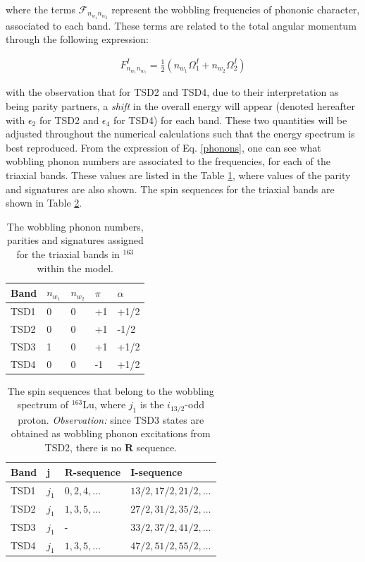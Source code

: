 \documentclass[%
 reprint,
 amsmath,
 amssymb,
 aps,
 floatfix,
]{revtex4-2}
\begin{document}
where the terms $\mathcal{F}_{n_{w_1}n_{w_2}}$ represent the wobbling frequencies of phononic character, associated to each band. These terms are related to the total angular momentum through the following expression:

\begin{align}
    F_{n_{w_1}n_{w_1}}^I=\frac{1}{2}\left(n_{w_1}\Omega_1^I+n_{w_2}\Omega_2^I\right) \label{phonons}
\end{align}

with the observation that for TSD2 and TSD4, due to their interpretation as being parity partners, a \emph{shift} in the overall energy will appear (denoted hereafter with $\epsilon_2$ for TSD2 and $\epsilon_4$ for TSD4) for each band. These two quantities will be adjusted throughout the numerical calculations such that the energy spectrum is best reproduced. From the expression of Eq. \ref{phonons}, one can see what wobbling phonon numbers are associated to the frequencies, for each of the triaxial bands. These values are listed in the Table \ref{tabular_phonon_numbers}, where values of the parity and signatures are also shown. The spin sequences for the triaxial bands are shown in Table \ref{spin_sequences}.

\begin{table}[h]
    \centering
  \begin{tabular}{lllll}
  \hline
Band & $n_{w_1}$ & $n_{w_2}$ &  $\pi$ &  $\alpha$ \\
\hline
\hline
TSD1 &     0      &       0    &    +1  &    +1/2      \\
TSD2 &    0       &       0    &    +1    &        -1/2  \\
TSD3 &     1      &     0      &    +1   &        +1/2  \\
TSD4 &     0      &     0      &    -1   &     +1/2    \\
\hline
\end{tabular}
    \caption{The wobbling phonon numbers, parities and signatures assigned for the triaxial bands in $^{163}$ within the model.}
    \label{tabular_phonon_numbers}
\end{table}

\begin{table}[h]
    \centering
  \begin{tabular}{llll}
  \hline
Band & j & $\mathbf{R}$-sequence & $\mathbf{I}$-sequence \\
\hline
\hline
TSD1 & $j_1$  &   $0,2,4,\dots$         &   $13/2,17/2,21/2,\dots$         \\
TSD2 & $j_1$  &   $1,3,5,\dots$         &           $27/2,31/2,35/2,\dots$ \\
TSD3 & $j_1$  & - & $33/2,37/2,41/2,\dots$     \\
TSD4 & $j_1$  &         $1,3,5,\dots$   &       $47/2,51/2,55/2,\dots$    
\end{tabular}
    \caption{The spin sequences that belong to the wobbling spectrum of $^{163}$Lu, where $j_1$ is the $i_{13/2}$-odd proton. \emph{Observation:} since TSD3 states are obtained as wobbling phonon excitations from TSD2, there is no $\mathbf{R}$ sequence.}
    \label{spin_sequences}
\end{table}
\end{document}
